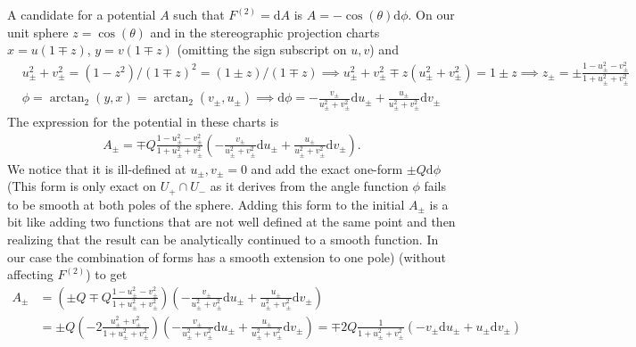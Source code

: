 \documentclass[10pt, a4paper]{article}
\begin{document}
{\begin{enumerate}
  A candidate for a potential $A$ such that $F^{(2)} = \text{d}A$ is $A = -\cos(\theta)\text{d}\phi$. On our unit sphere $z = \cos(\theta)$ and in the stereographic projection charts $x = u (1\mp z)$, $y = v (1\mp z)$ (omitting the sign subscript on $u, v$) and 
  \begin{align*}
    &u_\pm^2 + v_\pm^2 = (1-z^2)/(1\mp z)^2 = (1 \pm z)/(1 \mp z) \implies u_\pm^2 + v_\pm^2 \mp z(u_\pm^2 + v_\pm^2)  = 1 \pm z \implies  z_\pm = \pm \frac{1 - u_\pm^2 - v_\pm^2}{1 + u_\pm^2 + v_\pm^2}\\
    &\phi = \arctan_2(y, x) = \arctan_2(v_\pm, u_\pm) \implies \text{d}\phi = -\frac{v_\pm}{u_\pm^2+v_\pm^2}\text{d}u_\pm + \frac{u_\pm}{u^2_\pm+v^2_\pm}\text{d}v_\pm
  \end{align*}
  The expression for the potential in these charts is 
  \begin{align*}
    A_\pm = \mp Q\frac{1 - u_\pm^2 - v_\pm^2}{1 + u_\pm^2 + v_\pm^2} \left(-\frac{v_\pm}{u_\pm^2+v_\pm^2}\text{d}u_\pm + \frac{u_\pm}{u_\pm^2+v_\pm^2}\text{d}v_{\pm} \right). 
  \end{align*}
  We notice that it is ill-defined at $u_\pm, v_\pm = 0$ and add the exact one-form $\pm Q\text{d}\phi$ (This form is only exact on $U_{+} \cap U_{-}$ as it derives from the angle function $\phi$ fails to be smooth at both poles of the sphere. Adding this form to the initial $A_\pm$ is a bit like adding two functions that are not well defined at the same point and then realizing that the result can be analytically continued to a smooth function. In our case the combination of forms has a smooth extension to one pole) (without affecting $F^{(2)}$) to get 
  \begin{align*}
    A_\pm &= \left(\pm Q \mp Q  \frac{1 - u_\pm^2 - v_\pm^2}{1 + u_\pm^2 + v_\pm^2}\right) \left(-\frac{v_\pm}{u_\pm^2+v_\pm^2}\text{d}u_\pm + \frac{u_\pm}{u_\pm^2+v_\pm^2}\text{d}v_{\pm}\right)\\
    &=  
    \pm Q\left(- 2 \frac{u_\pm^2 + v_\pm^2}{1 + u_\pm^2 + v_\pm^2}\right) \left(-\frac{v_\pm}{u_\pm^2+v_\pm^2}\text{d}u_\pm + \frac{u_\pm}{u_\pm^2+v_\pm^2}\text{d}v_{\pm} \right) = \mp 2Q\frac{1}{1 + u_\pm^2 + v_\pm^2}\left(-v_\pm\text{d}u_\pm + u_\pm\text{d}v_{\pm} \right) 
  \end{align*}

\end{enumerate}}
\end{document}
